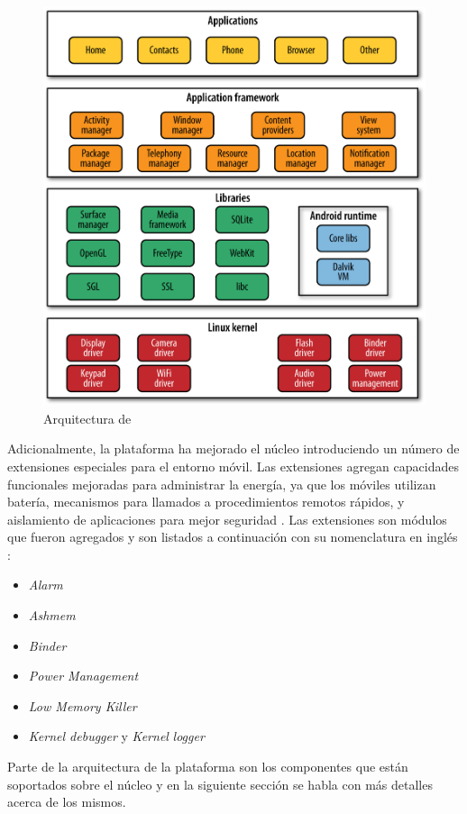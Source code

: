 \begin{figure}[H]
\begin{centering}
\includegraphics[width=0.8\columnwidth]{capitulo-5/graphics/android_stack}
\par\end{centering}
\caption[Arquitectura de Android]{\label{fig5:android-stack}Arquitectura de }
\end{figure}

Adicionalmente, la plataforma ha mejorado el núcleo introduciendo
un número de extensiones especiales para el entorno móvil. Las extensiones
agregan capacidades funcionales mejoradas para administrar la energía,
ya que los móviles utilizan batería, mecanismos para llamados a procedimientos
remotos rápidos, y aislamiento de aplicaciones para mejor seguridad
\cite{Gargenta2014}. Las extensiones son módulos que fueron agregados
y son listados a continuación con su nomenclatura en inglés \cite{Schreiber2011}: 
\begin{itemize}
\item \emph{Alarm }
\item \emph{Ashmem}
\item \emph{Binder}
\item \emph{Power Management}
\item \emph{Low Memory Killer}
\item \emph{Kernel debugger} y \emph{Kernel} \emph{logger}
\end{itemize}
Parte de la arquitectura de la plataforma son los componentes que
están soportados sobre el núcleo y en la siguiente sección se habla
con más detalles acerca de los mismos.

